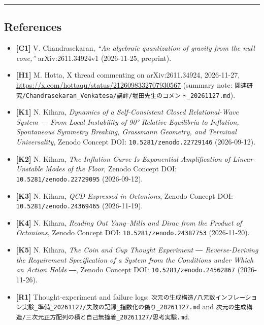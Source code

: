 \documentclass[
  a4paper,
]{article}
\providecommand{\tightlist}{%
  \setlength{\itemsep}{0pt}\setlength{\parskip}{0pt}}
\begin{document}
\begin{center}\rule{0.5\linewidth}{0.5pt}\end{center}

\subsection{References}\label{references}

\begin{itemize}
\tightlist
\item
  \textbf{{[}C1{]}} V. Chandrasekaran, \emph{``An algebraic quantization
  of gravity from the null cone,''} arXiv:2611.34924v1 (2026-11-25,
  preprint).
\item
  \textbf{{[}H1{]}} M. Hotta, X thread commenting on arXiv:2611.34924,
  2026-11-27, \url{https://x.com/hottaqu/status/2126098332707930567} (summary
  note:
  \texttt{関連研究/\allowbreak{}Chandrasekaran\_\allowbreak{}Venkatesa/\allowbreak{}講評/\allowbreak{}堀田先生のコメント\_\allowbreak{}20261127.md}).
\item
  \textbf{{[}K1{]}} N. Kihara, \emph{Dynamics of a Self-Consistent
  Closed Relational-Wave System --- From Local Instability of 90°
  Relative Equilibria to Inflation, Spontaneous Symmetry Breaking,
  Grassmann Geometry, and Terminal Universality}, Zenodo Concept DOI:
  \texttt{10.5281/\allowbreak{}zenodo.22729146} (2026-09-12).
\item
  \textbf{{[}K2{]}} N. Kihara, \emph{The Inflation Curve Is Exponential
  Amplification of Linear Unstable Modes of the Floor}, Zenodo Concept
  DOI: \texttt{10.5281/\allowbreak{}zenodo.22729095} (2026-09-12).
\item
  \textbf{{[}K3{]}} N. Kihara, \emph{QCD Expressed in Octonions}, Zenodo
  Concept DOI: \texttt{10.5281/\allowbreak{}zenodo.24369465} (2026-11-19).
\item
  \textbf{{[}K4{]}} N. Kihara, \emph{Reading Out Yang--Mills and Dirac
  from the Product of Octonions}, Zenodo Concept DOI:
  \texttt{10.5281/\allowbreak{}zenodo.24387753} (2026-11-20).
\item
  \textbf{{[}K5{]}} N. Kihara, \emph{The Coin and Cup Thought Experiment
  ― Reverse-Deriving the Requirement Specification of a System from the
  Conditions under Which an Action Holds ―}, Zenodo Concept DOI:
  \texttt{10.5281/\allowbreak{}zenodo.24562867} (2026-11-26).
\item
  \textbf{{[}R1{]}} Thought-experiment and failure logs:
  \texttt{次元の生成構造/\allowbreak{}八元数インフレーション実験\_\allowbreak{}準備\_\allowbreak{}20261127/\allowbreak{}失敗の記録\_\allowbreak{}指数化の偽り\_\allowbreak{}20261127.md}
  and
  \texttt{次元の生成構造/\allowbreak{}三次元正方配列の積と自己無撞着\_\allowbreak{}20261127/\allowbreak{}思考実験.md}.
\end{itemize}
\end{document}
